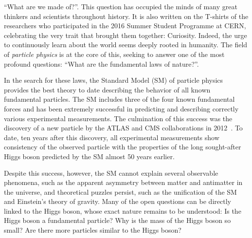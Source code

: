 
``What are we made of?''. This question has occupied the minds of many great thinkers and scientists throughout history. It is also written on the T-shirts of the researchers who participated in the 2016 Summer Student Programme at CERN, celebrating the very trait that brought them together: Curiosity. Indeed, the urge to continuously learn about the world seems deeply rooted in humanity.
The field of \emph{particle physics} is at the core of this, seeking to answer one of the most profound questions: ``What are the fundamental laws of nature?''.

In the search for these laws, the Standard Model (SM) of particle physics provides the best theory to date describing the behavior of all known fundamental particles. 
The SM includes three of the four known fundamental forces and has been extremely successful in predicting and describing correctly various experimental measurements. 
The culmination of this success was the discovery of a new particle by the ATLAS and CMS collaborations in 2012~\cite{HIGG-2012-27,CMS-HIG-12-028}.
To date, ten years after this discovery, all experimental measurements show consistency of the observed particle with the properties of the long sought-after Higgs boson predicted by the SM almost 50 years earlier.

Despite this success, however, the SM cannot explain several observable phenomena, such as the apparent asymmetry between matter and antimatter in the universe, and theoretical puzzles persist, such as the unification of the SM and Einstein's theory of gravity.
Many of the open questions can be directly linked to the Higgs boson, whose exact nature remains to be understood: Is the Higgs boson a fundamental particle? Why is the mass of the Higgs boson so small? Are there more particles similar to the Higgs boson?


